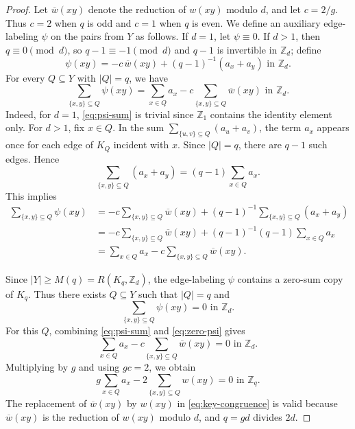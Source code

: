 ﻿\documentclass[11pt]{article}
\numberwithin{equation}{section}
\theoremstyle{remark}
\newcommand{\Z}{\mathbb Z}
\begin{document}
\begin{proof}
    Let $\overline w(xy)$ denote the reduction of $w(xy)$ modulo $d$, and let $c=2/g$.
    Thus $c=2$ when $q$ is odd and $c=1$ when $q$ is even.
    We define an auxiliary edge-labeling $\psi$ on the pairs from $Y$ as follows.
    If $d=1$, let $\psi\equiv0$.
    If $d>1$, then $q\equiv0\pmod d$, so $q-1\equiv -1\pmod d$ and $q-1$ is invertible in $\Z_d$; define
    \[
        \psi(xy)=-c\,\overline w(xy)+(q-1)^{-1}(a_x+a_y)
        \text{ in }\Z_d.
    \]
    For every $Q\subseteq Y$ with $|Q|=q$, we have
    \begin{equation}\label{eq:psi-sum}
        \sum_{\{x,y\}\subseteq Q}\psi(xy)=\sum_{x\in Q}a_x-c\sum_{\{x,y\}\subseteq Q}\overline w(xy)
        \text{ in }\Z_d.
    \end{equation}
    Indeed, for $d=1$, \eqref{eq:psi-sum} is trivial since $\Z_1$ contains the identity element only.
    For \(d>1\), fix \(x\in Q\). In the sum
    \(\sum_{\{u,v\}\subseteq Q}(a_u+a_v)\), the term \(a_x\) appears once for each edge of \(K_Q\) incident with \(x\). Since \(|Q|=q\), there are \(q-1\) such edges.
    Hence
    \[
        \sum_{\{x,y\}\subseteq Q}(a_x+a_y)=(q-1)\sum_{x\in Q}a_x .
    \]
    This implies
    \[
        \begin{aligned}
            \sum_{\{x,y\}\subseteq Q}\psi(xy)
             & =-c\sum_{\{x,y\}\subseteq Q}\overline w(xy)
            +(q-1)^{-1}\sum_{\{x,y\}\subseteq Q}(a_x+a_y)                   \\
             & =-c\sum_{\{x,y\}\subseteq Q}\overline w(xy)
            +(q-1)^{-1}(q-1)\sum_{x\in Q}a_x                                \\
             & =\sum_{x\in Q}a_x-c\sum_{\{x,y\}\subseteq Q}\overline w(xy).
        \end{aligned}
    \]

    Since $|Y|\ge M(q)=R(K_q,\Z_d)$, the edge-labeling $\psi$ contains a zero-sum copy of $K_q$.
    Thus there exists $Q\subseteq Y$ such that $|Q|=q$ and
    \begin{equation}\label{eq:zero-psi}
        \sum_{\{x,y\}\subseteq Q}\psi(xy)=0
        \text{ in }\Z_d.
    \end{equation}
    For this $Q$, combining \eqref{eq:psi-sum} and \eqref{eq:zero-psi} gives
    \[
        \sum_{x\in Q}a_x-c\sum_{\{x,y\}\subseteq Q}\overline w(xy)=0
        \text{ in }\Z_d.
    \]
    Multiplying by $g$ and using $gc=2$, we obtain
    \begin{equation}\label{eq:key-congruence}
        g\sum_{x\in Q}a_x-2\sum_{\{x,y\}\subseteq Q}w(xy)=0
        \text{ in }\Z_q.
    \end{equation}
    The replacement of $\overline w(xy)$ by $w(xy)$ in \eqref{eq:key-congruence} is valid because $\overline w(xy)$ is the reduction of $w(xy)$ modulo $d$, and $q=gd$ divides $2d$.


\end{proof}
\end{document}
